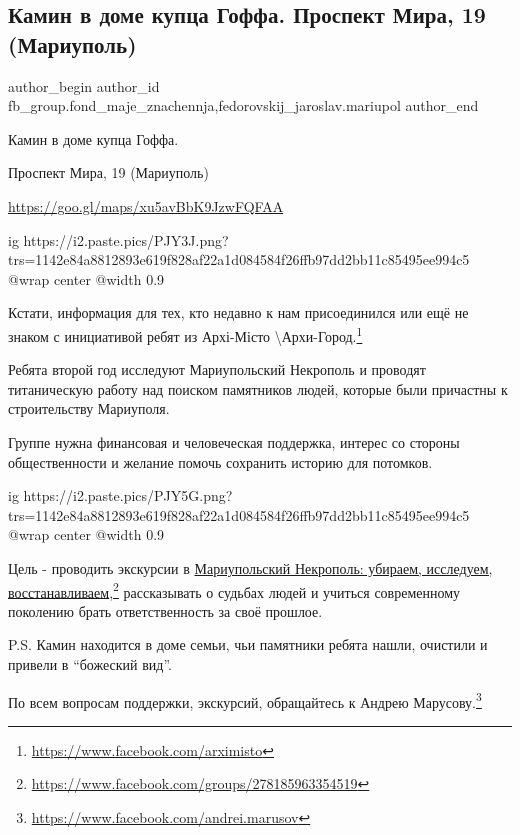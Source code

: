  
 
 
 
 
 
\subsection{Камин в доме купца Гоффа. Проспект Мира, 19 (Мариуполь)}
\label{sec:18_07_2021.fb.fb_group.fond_maje_znachennja.1.kamin_v_dome_kupca_goffa}
 
\ifcmt
 author_begin
   author_id fb_group.fond_maje_znachennja,fedorovskij_jaroslav.mariupol
 author_end
\fi

Камин в доме купца Гоффа. 

Проспект Мира, 19 (Мариуполь) 

\url{https://goo.gl/maps/xu5avBbK9JzwFQFAA}

\ifcmt
  ig https://i2.paste.pics/PJY3J.png?trs=1142e84a8812893e619f828af22a1d084584f26ffb97dd2bb11c85495ee994c5
  @wrap center
  @width 0.9
\fi

Кстати, информация для тех, кто недавно к нам присоединился или ещё не знаком с
инициативой ребят из Архі-Місто \textbackslash Архи-Город.\footnote{\url{https://www.facebook.com/arximisto}}

Ребята второй год исследуют Мариупольский Некрополь и проводят титаническую
работу над поиском памятников людей, которые были причастны к строительству
Мариуполя. 

Группе нужна финансовая и человеческая поддержка, интерес со стороны
общественности и желание помочь сохранить историю для потомков.

\ifcmt
  ig https://i2.paste.pics/PJY5G.png?trs=1142e84a8812893e619f828af22a1d084584f26ffb97dd2bb11c85495ee994c5
  @wrap center
  @width 0.9
\fi

Цель - проводить экскурсии в
\href{https://www.facebook.com/groups/278185963354519}{Мариупольский Некрополь:
убираем, исследуем,
восстанавливаем},\footnote{\url{https://www.facebook.com/groups/278185963354519}}
рассказывать о судьбах людей и учиться современному поколению брать
ответственность за своё прошлое.

P.S. Камин находится в доме семьи, чьи памятники ребята нашли, очистили и
привели в \enquote{божеский вид}. 

По всем вопросам поддержки, экскурсий, обращайтесь к Андрею Марусову.\footnote{\url{https://www.facebook.com/andrei.marusov}}
